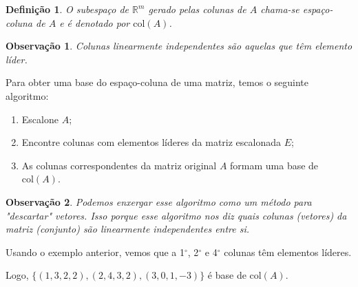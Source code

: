 \documentclass{article}
\newtheorem*{remark}{Observação}
\newtheorem*{definition}{Definição}
\begin{document}
\begin{definition}
	O subespaço de $\mathbb{R}^m$ gerado pelas colunas de $A$ chama-se espaço-coluna de $A$ e é denotado por $\text{col}(A)$.
\end{definition}

\begin{remark}
	Colunas linearmente independentes são aquelas que têm elemento líder.
\end{remark}

\par\vspace{0.3cm} Para obter uma base do espaço-coluna de uma matriz, temos o seguinte algoritmo:

\begin{enumerate}
	\item Escalone $A$;
	\item Encontre colunas com elementos líderes da matriz escalonada $E$;
	\item As colunas correspondentes da matriz original $A$ formam uma base de $\text{col}(A)$.
\end{enumerate}

\begin{remark}
	Podemos enxergar esse algoritmo como um método para "descartar" vetores. Isso porque esse algoritmo nos diz quais colunas (vetores) da matriz (conjunto) são linearmente independentes entre si.
\end{remark}

\par\vspace{0.3cm} Usando o exemplo anterior, vemos que a 1$^{\circ}$, 2$^{\circ}$ e 4$^{\circ}$ colunas têm elementos líderes. 
\par\vspace{0.3cm} Logo, $\{ (1, 3, 2, 2), (2, 4, 3, 2), (3, 0, 1, -3)  \}$ é base de $\text{col}(A)$.
\end{document}
